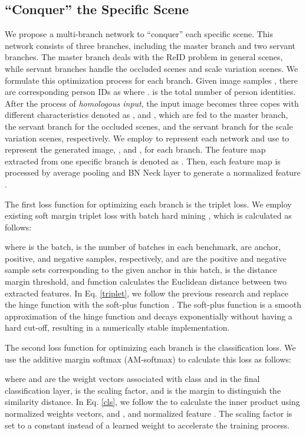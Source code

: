 \documentclass[a4paper]{cas-dc}
\begin{document}
\subsection{``Conquer'' the Specific Scene}
We propose a multi-branch network to ``conquer'' each specific scene. This network consists of three branches, including the master branch and two servant branches. The master branch deals with the ReID problem in general scenes, while servant branches handle the occluded scenes and scale variation scenes. We formulate this optimization process for each branch. Given  image samples , there are corresponding person IDs as  where .  is the total number of person identities. After the process of \textit{homologous input}, the input image  becomes three copes with different characteristics denoted as , and , which are fed to the master branch, the servant branch for the occluded scenes, and the servant branch for the scale variation scenes, respectively. We employ  to represent each network and use  to represent the generated image, , and , for each branch. The feature map extracted from one specific branch is denoted as . Then, each feature map is processed by average pooling and BN Neck layer to generate a normalized feature .

The first loss function for optimizing each branch is the triplet loss. We employ existing soft margin triplet loss with batch hard mining \cite{RN487}, which is calculated as follows:

\noindent where  is the  batch,  is the number of batches in each benchmark,  are anchor, positive, and negative samples, respectively,  and  are the positive and negative sample sets corresponding to the given anchor  in this batch,  is the distance margin threshold, and function  calculates the Euclidean distance between two extracted features. In Eq. \ref{triplet}, we follow the previous research \cite{RN196} \cite{RN502} \cite{RN487} and replace the hinge function  with the soft-plus function . The soft-plus function is a smooth approximation of the hinge function and decays exponentially without having a hard cut-off, resulting in a numerically stable implementation. 

The second loss function for optimizing each branch is the classification loss. We use the additive margin softmax (AM-softmax) \cite{RN486} to calculate this loss as follows:
 

\noindent where  and  are the weight vectors associated with class  and  in the final classification layer,  is the scaling factor, and  is the margin to distinguish the similarity distance. In Eq. \ref{cls}, we follow the \cite{RN504} \cite{RN505} \cite{RN506} \cite{RN486} to calculate the inner product using normalized weights vectors,  and , and normalized feature . The scaling factor  is set to a constant instead of a learned weight to accelerate the training process. 
\end{document}
